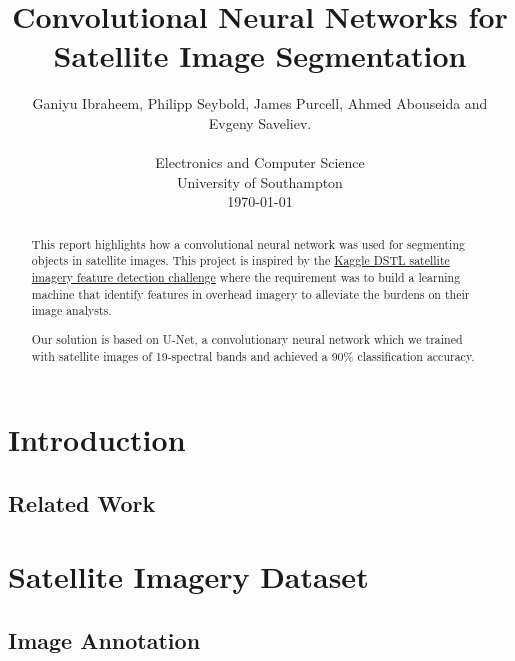\documentclass[10pt,twocolumn]{article}
\begin{document}
\title{Convolutional Neural Networks for Satellite Image Segmentation}

\author{Ganiyu Ibraheem, Philipp Seybold, James Purcell, Ahmed Abouseida and Evgeny Saveliev. \\
\\
Electronics and Computer Science \\
University of Southampton \\
\today
}


\maketitle
\thispagestyle{empty}

\begin{abstract}
This report highlights how a convolutional neural network was used for segmenting objects in satellite images. This project is inspired by the \href{https://www.kaggle.com/c/dstl-satellite-imagery-feature-detection}{Kaggle DSTL satellite imagery feature detection challenge} where the requirement was to build a learning machine that identify features in overhead imagery to alleviate the burdens on their image analysts.

Our solution is based on U-Net, a convolutionary neural network which we trained with satellite images of 19-spectral bands and achieved a 90\% classification accuracy. %
\end{abstract}


\section{Introduction}

	\subsection{Related Work}


\section{Satellite Imagery Dataset}
	\subsection{Image Annotation}
\end{document}
